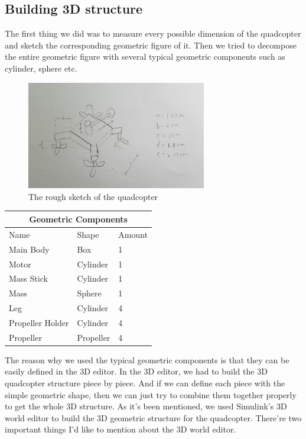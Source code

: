 \subsection{Building 3D structure}
The first thing we did was to measure every possible dimension of the quadcopter and sketch the corresponding geometric figure of it. Then we tried to decompose the entire geometric figure with several typical geometric components such as cylinder, sphere etc.
\begin{figure}[h]
\centering
\includegraphics[width=0.7\textwidth]{./Lin_img/0.jpg}
\caption{The rough sketch of the quadcopter}
\end{figure}
\begin{center}
\begin{tabular}{ |p{3cm}|p{3cm}|p{3cm}|  }
 \hline
 \multicolumn{3}{|c|}{Geometric Components} \\
 \hline
 Name   & Shape   &Amount \\
 \hline
 Main Body & Box & 1  \\
 Motor & Cylinder & 1  \\
 Mass Stick    & Cylinder & 1 \\
 Mass &  Sphere & 1 \\
 Leg & Cylinder & 4  \\
 Propeller Holder & Cylinder & 4  \\
 Propeller & Propeller & 4  \\
 \hline
\end{tabular}
\end{center}
The reason why we used the typical geometric components is that they can be easily defined in the 3D editor. In the 3D editor, we had to build the 3D quadcopter structure piece by piece. And if we can define each piece with the simple geometric shape, then we can just try to combine them together properly to get the whole 3D structure.
\newline
\newline
As it’s been mentioned, we used Simulink’s 3D world editor to build the 3D geometric structure for the quadcopter. There’re two important things I’d like to mention about the 3D world editor. 
